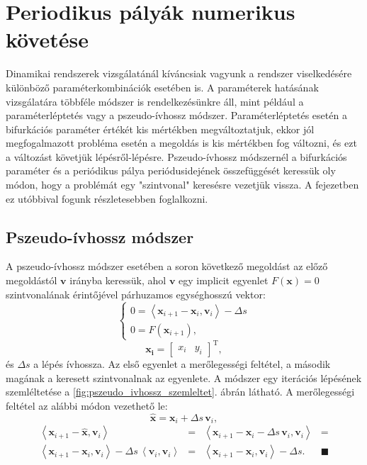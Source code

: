 \chapter{\label{sec:perpalyakovetes}Periodikus pályák numerikus követése}

Dinamikai rendszerek vizsgálatánál kíváncsiak vagyunk a rendszer viselkedésére különböző paraméterkombinációk esetében is.
A paraméterek ha\-tá\-sá\-nak vizsgálatára többféle módszer is rendelkezésünkre áll, mint például a paraméterléptetés vagy a pszeudo-ívhossz módszer.
Paraméterléptetés esetén a bifurkációs paraméter értékét kis mértékben megváltoztatjuk, ekkor jól megfogalmazott probléma esetén a megoldás is kis mértékben fog változni, és ezt a változást követjük lépésről-lépésre.
Pszeudo-ívhossz mód\-szer\-nél a bifurkációs paraméter és a periódikus pálya periódusidejének össze\-füg\-gé\-sét keressük oly módon, hogy a problémát egy "szintvonal" keresésre vezetjük vissza.
A fejezetben ez utóbbival fogunk részletesebben foglalkozni.

\section{Pszeudo-ívhossz módszer}
\label{sec:pseudo_ivhossz}

A pszeudo-ívhossz módszer esetében a soron következő megoldást az előző megoldástól $\mathbf{v}$ irányba keressük, ahol $\mathbf{v}$ egy implicit egyenlet $F(\mathbf{x}) = 0$ szintvonalának érintőjével párhuzamos egységhosszú vektor:
\begin{equation}
\begin{cases}
0 = \left< \mathbf{x}_{i+1} - \mathbf{x}_i, \mathbf{v}_i \right> - \Delta s \\
0 = F(\mathbf{x}_{i+1}),
\end{cases}
\label{eq:pszeudo_ivhossz_alapegyenlet}
\end{equation}
\begin{equation}
\mathbf{x_i}= \begin{bmatrix}
x_i & y_i
\end{bmatrix}^\mathrm{T},
\end{equation}
és $\Delta s$ a lépés ívhossza.
Az első egyenlet a merőlegességi feltétel, a második magának a keresett szintvonalnak az egyenlete.
A módszer egy iterációs lépésének szemléltetése a \ref{fig:pszeudo_ivhossz_szemleltet}. ábrán látható.
A merőlegességi feltétel az alábbi módon vezethető le:
\begin{equation}
\hat{\mathbf{x}} = \mathbf{x}_i + \Delta s \, \mathbf{v}_i,
\end{equation}
\begin{equation}
\begin{matrix}
\left< \mathbf{x}_{i+1} - \hat{\mathbf{x}}, \mathbf{v}_i \right> & = & 
\left< \mathbf{x}_{i+1} - \mathbf{x}_i - \Delta s \, \mathbf{v}_i, \mathbf{v}_i \right>  & = \\
\left< \mathbf{x}_{i+1} - \mathbf{x}_i, \mathbf{v}_i \right> - \Delta s \, \left< \mathbf{v}_i , \mathbf{v}_i \right> & = & \left< \mathbf{x}_{i+1} - \mathbf{x}_i, \mathbf{v}_i \right> - \Delta s. & \blacksquare 
\end{matrix}
\end{equation}

